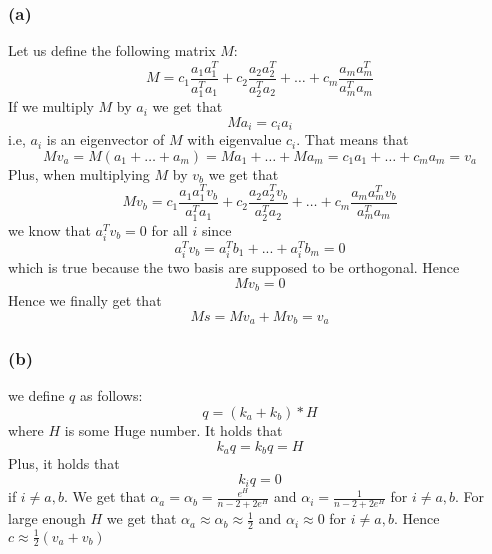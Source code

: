 \subsubsection*{(a)}
Let us define the following matrix $M$:
$$M=c_1 \frac{a_1 a_1^T}{a_1^T a_1} + c_2 \frac{a_2 a_2^T}{a_2^T a_2} + \dots + c_m \frac{a_m a_m^T}{a_m^T a_m}$$
If we multiply $M$ by $a_i$ we get that 
$$Ma_i = c_i a_i$$
i.e, $a_i$ is an eigenvector of $M$ with eigenvalue $c_i$. That means that 
$$Mv_a = M(a_1+ \dots + a_m) = Ma_1+ \dots + Ma_m=c_1a_1+ \dots +c_ma_m=v_a$$
Plus, when multiplying $M$ by $v_b$ we get that
$$Mv_b = c_1 \frac{a_1 a_1^T v_b}{a_1^T a_1} + c_2 \frac{a_2 a_2^T v_b}{a_2^T a_2} + \dots + c_m \frac{a_m a_m^T v_b}{a_m^T a_m}$$
we know that $a_i^T v_b = 0$ for all $i$ since 
$$a_i^T v_b = a_i^T b_1 + ... + a_i^T b_m = 0$$
which is true because the two basis are supposed to be orthogonal. Hence
$$Mv_b = 0$$
Hence we finally get that $$Ms=Mv_a+Mv_b=v_a$$ \newline
\subsubsection*{(b)}
we define $q$ as follows:
$$q = (k_a + k_b)*H$$ where $H$ is some Huge number. It holds that 
$$k_a q = k_b q = H$$
Plus, it holds that 
$$ k_i q = 0 $$ if $i \neq a,b$. We get that $\alpha_a = \alpha_b = \frac{e^H}{n-2 + 2e^H}$ and $\alpha_i=\frac{1}{n-2 + 2e^H}$ for $i \neq a,b$. \newline
For large enough $H$ we get that $\alpha_a \approx \alpha_b \approx \frac{1}{2}$ and $\alpha_i \approx 0$ for $i \neq a,b$. Hence $c \approx \frac{1}{2}(v_a + v_b)$